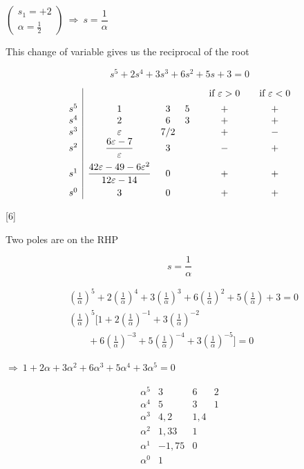 \documentclass[11pt,a4paper]{article}
\begin{document}
$\left(\begin{array}{l} s_1=+2\\ \alpha=\tfrac12\end{array}\right)\ \Rightarrow\ s=\dfrac{1}{\alpha}$

This change of variable gives us the reciprocal of the root

\[
s^5+2s^4+3s^3+6s^2+5s+3=0
\]

\[
\begin{array}{c|ccc@{\qquad}c@{\qquad}c}
 & & & & \text{if } \varepsilon>0 & \text{if } \varepsilon<0\\[4pt]
s^5 & 1 & 3 & 5 & + & +\\
s^4 & 2 & 6 & 3 & + & +\\
s^3 & \varepsilon & 7/2 & & + & -\\
s^2 & \dfrac{6\varepsilon-7}{\varepsilon} & 3 & & - & +\\[8pt]
s^1 & \dfrac{42\varepsilon-49-6\varepsilon^2}{12\varepsilon-14} & 0 & & + & +\\[8pt]
s^0 & 3 & 0 & & + & +
\end{array}
\]

[6]

Two poles are on the RHP

\[
s=\frac{1}{\alpha}
\]

\begin{align*}
&\left(\tfrac{1}{\alpha}\right)^5+2\left(\tfrac{1}{\alpha}\right)^4+3\left(\tfrac{1}{\alpha}\right)^3+6\left(\tfrac{1}{\alpha}\right)^2+5\left(\tfrac{1}{\alpha}\right)+3=0\\
&\left(\tfrac{1}{\alpha}\right)^5\Big[1+2\left(\tfrac{1}{\alpha}\right)^{-1}+3\left(\tfrac{1}{\alpha}\right)^{-2}\\
&\qquad{}+6\left(\tfrac{1}{\alpha}\right)^{-3}+5\left(\tfrac{1}{\alpha}\right)^{-4}+3\left(\tfrac{1}{\alpha}\right)^{-5}\Big]=0
\end{align*}

$\Rightarrow\ 1+2\alpha+3\alpha^2+6\alpha^3+5\alpha^4+3\alpha^5=0$

\[
\begin{array}{c|ccc}
\alpha^5 & 3 & 6 & 2\\
\alpha^4 & 5 & 3 & 1\\
\alpha^3 & 4{,}2 & 1{,}4 & \\
\alpha^2 & 1{,}33 & 1 & \\
\alpha^1 & -1{,}75 & 0 & \\
\alpha^0 & 1 & &
\end{array}
\]
\end{document}
